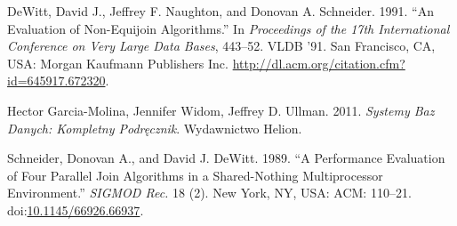 \documentclass[]{article}
\begin{document}
\hypertarget{ref-EVA1991}{}
DeWitt, David J., Jeffrey F. Naughton, and Donovan A. Schneider. 1991.
``An Evaluation of Non-Equijoin Algorithms.'' In \emph{Proceedings of
the 17th International Conference on Very Large Data Bases}, 443--52.
VLDB '91. San Francisco, CA, USA: Morgan Kaufmann Publishers Inc.
\url{http://dl.acm.org/citation.cfm?id=645917.672320}.

\hypertarget{ref-SYS2011}{}
Hector Garcia-Molina, Jennifer Widom, Jeffrey D. Ullman. 2011.
\emph{Systemy Baz Danych: Kompletny Podręcznik}. Wydawnictwo Helion.

\hypertarget{ref-PER1989}{}
Schneider, Donovan A., and David J. DeWitt. 1989. ``A Performance
Evaluation of Four Parallel Join Algorithms in a Shared-Nothing
Multiprocessor Environment.'' \emph{SIGMOD Rec.} 18 (2). New York, NY,
USA: ACM: 110--21.
doi:\href{https://doi.org/10.1145/66926.66937}{10.1145/66926.66937}.
\end{document}
